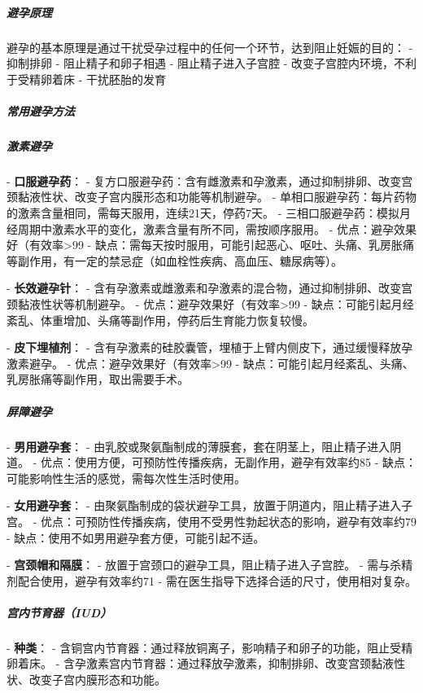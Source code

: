 \begin{enumerate}
\subparagraph{避孕原理}

避孕的基本原理是通过干扰受孕过程中的任何一个环节，达到阻止妊娠的目的：
- 抑制排卵
- 阻止精子和卵子相遇
- 阻止精子进入子宫腔
- 改变子宫腔内环境，不利于受精卵着床
- 干扰胚胎的发育

\subparagraph{常用避孕方法}

\subparagraph{激素避孕}

- \textbf{口服避孕药}：
  - 复方口服避孕药：含有雌激素和孕激素，通过抑制排卵、改变宫颈黏液性状、改变子宫内膜形态和功能等机制避孕。
  - 单相口服避孕药：每片药物的激素含量相同，需每天服用，连续21天，停药7天。
  - 三相口服避孕药：模拟月经周期中激素水平的变化，激素含量有所不同，需按顺序服用。
  - 优点：避孕效果好（有效率>99%
  - 缺点：需每天按时服用，可能引起恶心、呕吐、头痛、乳房胀痛等副作用，有一定的禁忌症（如血栓性疾病、高血压、糖尿病等）。

- \textbf{长效避孕针}：
  - 含有孕激素或雌激素和孕激素的混合物，通过抑制排卵、改变宫颈黏液性状等机制避孕。
  - 优点：避孕效果好（有效率>99%
  - 缺点：可能引起月经紊乱、体重增加、头痛等副作用，停药后生育能力恢复较慢。

- \textbf{皮下埋植剂}：
  - 含有孕激素的硅胶囊管，埋植于上臂内侧皮下，通过缓慢释放孕激素避孕。
  - 优点：避孕效果好（有效率>99%
  - 缺点：可能引起月经紊乱、头痛、乳房胀痛等副作用，取出需要手术。

\subparagraph{屏障避孕}

- \textbf{男用避孕套}：
  - 由乳胶或聚氨酯制成的薄膜套，套在阴茎上，阻止精子进入阴道。
  - 优点：使用方便，可预防性传播疾病，无副作用，避孕有效率约85%
  - 缺点：可能影响性生活的感觉，需每次性生活时使用。

- \textbf{女用避孕套}：
  - 由聚氨酯制成的袋状避孕工具，放置于阴道内，阻止精子进入子宫。
  - 优点：可预防性传播疾病，使用不受男性勃起状态的影响，避孕有效率约79%
  - 缺点：使用不如男用避孕套方便，可能引起不适。

- \textbf{宫颈帽和隔膜}：
  - 放置于宫颈口的避孕工具，阻止精子进入子宫腔。
  - 需与杀精剂配合使用，避孕有效率约71%
  - 需在医生指导下选择合适的尺寸，使用相对复杂。

\subparagraph{宫内节育器（IUD）}

- \textbf{种类}：
  - 含铜宫内节育器：通过释放铜离子，影响精子和卵子的功能，阻止受精卵着床。
  - 含孕激素宫内节育器：通过释放孕激素，抑制排卵、改变宫颈黏液性状、改变子宫内膜形态和功能。


\end{enumerate}
